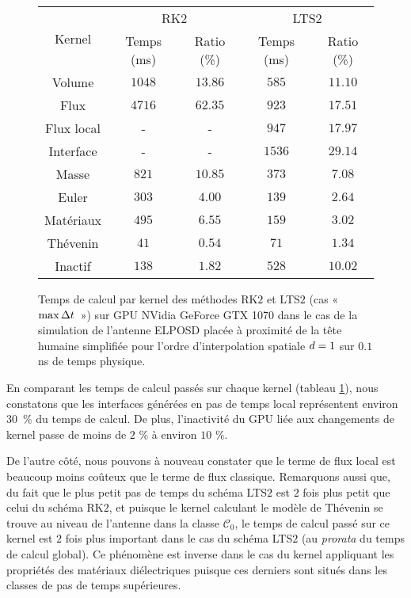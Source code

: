 \begin{figure}[!h]
	\centering
	\caption{
		\label{tab:lts2_ratios}
		Temps de calcul par kernel des méthodes RK$2$ et LTS$2$ (cas «~$\max\Delta t$~»)
		sur GPU NVidia GeForce GTX 1070
		dans le cas de la simulation de l'antenne ELPOSD
		placée à proximité de la tête humaine simplifiée
		pour l'ordre d'interpolation spatiale $d = 1$
		sur $0.1$ ns de temps physique.
	}
	
	\begin{tabular}{|c|c|c|c|c|}
		\hline
		\multirow{2}{*}{Kernel} & \multicolumn{2}{c|}{RK$2$} & \multicolumn{2}{c|}{LTS$2$} \\	\cline{2-5}
		& Temps (ms) & Ratio (\%) & Temps (ms) & Ratio (\%) \\	\hline\hline
		Volume & $1048$ & $13.86$ & $585$ & $11.10$ \\	\hline 
		Flux & $4716$ & $62.35$ & $923$ & $17.51$ \\	\hline 
		Flux local & - & - & $947$ & $17.97$ \\	\hline 
		Interface & - & - & $1536$ & $29.14$ \\	\hline 
		Masse & $821$ & $10.85$ & $373$ & $7.08$ \\	\hline 
		Euler & $303$ & $4.00$ & $139$ & $2.64$ \\	\hline 
		Matériaux & $495$ & $6.55$ & $159$ & $3.02$ \\	\hline 
		Thévenin & $41$ & $0.54$ & $71$ & $1.34$ \\	\hline 
		Inactif & $138$ & $1.82$ & $528$ & $10.02$ \\	\hline
	\end{tabular}
\end{figure}

En comparant les temps de calcul passés sur chaque kernel
(tableau \ref{tab:lts2_ratios}), nous constatons que les interfaces
générées en pas de temps local représentent environ $30$~\% du temps de calcul.
De plus, l'inactivité du GPU liée aux changements de kernel
passe de moins de $2$ \% à environ $10$ \%.

De l'autre côté, nous pouvons à nouveau constater que le terme de flux local est
beaucoup moins coûteux que le terme de flux classique.
Remarquons aussi que, du fait que le plus petit pas de temps du schéma LTS$2$
est $2$ fois plus petit que celui du schéma RK$2$, et puisque le kernel
calculant le modèle de Thévenin se trouve au niveau de l'antenne
dans la classe $\mathcal{C}_0$, le temps de calcul passé sur ce kernel
est $2$ fois plus important dans le cas du schéma LTS$2$ (au \textit{prorata}
du temps de calcul global).
Ce phénomène est inverse dans le cas du kernel appliquant les propriétés
des matériaux diélectriques puisque ces derniers sont situés
dans les classes de pas de temps supérieures.
\\





